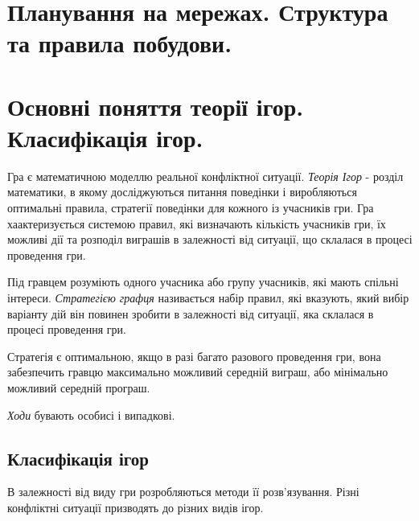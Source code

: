 \documentclass[12pt,a4paper]{article}
\begin{document}
\clearpage

\section{Планування на мережах. Структура та правила побудови.}

\clearpage

\section{Основні поняття теорії ігор. Класифікація ігор.}

Гра є математичною моделлю реальної конфліктної ситуації. \emph{Теорія Ігор} - розділ математики, в якому досліджуються питання поведінки і виробляються оптимальні правила, стратегії поведінки для кожного із учасників гри. Гра хаактеризується системою правил, які визначають кількість учасників гри, їх можливі дії та розподіл виграшів в залежності від ситуації, що склалася в процесі проведення гри.

Під гравцем розуміють одного учасника або групу учасників, які мають спільні інтереси. \emph{Стратегією графця} називається набір правил, які вказують, який вибір варіанту дій він повинен зробити в залежності від ситуації, яка склалася в процесі проведення гри.

Стратегія є оптимальною, якщо в разі багато разового проведення гри, вона забезпечить гравцю максимально можливий середній виграш, або мінімально можливий середній програш.

\emph{Ходи} бувають особисі і випадкові.

\subsection*{Класифікація ігор}

В залежності від виду гри розробляються методи її розв'язування. Різні конфліктні ситуації призводять до різних видів ігор.
\end{document}
